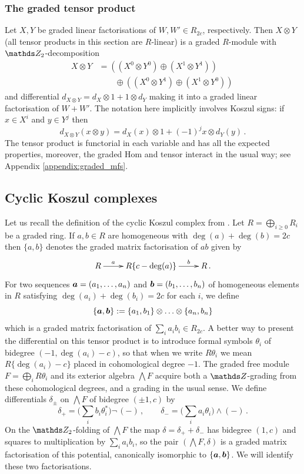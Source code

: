 \documentclass{compositio}
\theoremstyle{definition}
\numberwithin{equation}{section}
\begin{document}
\subsubsection{The graded tensor product} Let $X,Y$ be graded linear factorisations of $W,W' \in R_{2c}$, respectively. Then $X \otimes Y$ (all tensor products in this section are $R$-linear) is a graded $R$-module with $\Ztwo$-decomposition
\begin{align*}
X \otimes Y &= \left( (X^0 \otimes Y^0) \oplus (X^1 \otimes Y^1) \right)\\
&\qquad \oplus \left( (X^0 \otimes Y^1) \oplus (X^1 \otimes Y^0) \right)\,
\end{align*}
and differential $d_{X\otimes Y} = d_X \otimes 1 + 1 \otimes d_Y$ making it into a graded linear factorisation of $W + W'$. The notation here implicitly involves Koszul signs: if $x \in X^i$ and $y \in Y^j$ then
\[
d_{X\otimes Y}( x \otimes y ) = d_X(x) \otimes 1 + (-1)^j x \otimes d_Y(y) \, .
\]
The tensor product is functorial in each variable and has all the expected properties, moreover, the graded Hom and tensor interact in the usual way; see Appendix \ref{appendix:graded_mfs}.

\subsection{Cyclic Koszul complexes}\label{prelim:cyclic_koszul}

Let us recall the definition of the cyclic Koszul complex from \cite[Section~2]{kr0401268}. Let $R = \bigoplus_{i \ge 0} R_i$ be a graded ring. If $a,b\in R$ are homogeneous with $\deg(a) + \deg(b) = 2c$ then $\{ a, b \}$ denotes the graded matrix factorisation of $ab$ given by
\[
\xymatrix{
R \ar[r]^-{a} & R\{ c - \deg(a) \} \ar[r]^-{b} & R \, .
}
\]
For two sequences $\boldsymbol{a} = (a_1,\ldots,a_n)$ and $\boldsymbol{b} = (b_1, \ldots, b_n)$ of homogeneous elements in $R$ satisfying $\deg(a_i) + \deg(b_i) = 2c$ for each $i$, we define
\[
\{ \boldsymbol{a}, \boldsymbol{b} \} := \{a_1,b_1\} \otimes \ldots \otimes \{a_n, b_n\}
\]
which is a graded matrix factorisation of $\sum_i a_i b_i \in R_{2c}$. A better way to present the differential on this tensor product is to introduce formal symbols $\theta_i$ of bidegree $(-1, \deg(a_i) - c)$, so that when we write $R \theta_i$ we mean $R\{ \deg(a_i) - c \}$ placed in cohomological degree $-1$. The graded free module $F = \bigoplus_i R\theta_i$ and its exterior algebra $\bigwedge F$ acquire both a $\ZZ$-grading from these cohomological degrees, and a grading in the usual sense. We define differentials $\delta_{\pm}$ on $\bigwedge F$ of bidegree $(\pm 1,c)$ by
\[
\delta_+ = \Big(\sum_i b_i \theta_i^*\Big) \neg\, (-) \, , \qquad \delta_{-} = \Big(\sum_i a_i \theta_i\Big) \wedge (-)\,.
\]
On the $\Ztwo$-folding of $\bigwedge F$ the map $\delta = \delta_+ + \delta_-$ has bidegree $(1,c)$ and squares to multiplication by $\sum_i a_i b_i$, so the pair $(\bigwedge F, \delta)$ is a graded matrix factorisation of this potential, canonically isomorphic to $\{ \boldsymbol{a}, \boldsymbol{b} \}$. We will identify these two factorisations.
\end{document}
